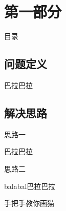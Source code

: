 \section{第一部分}
\begin{frame}[noframenumbering]{目录}
\end{frame}

\subsection{问题定义}
\begin{frame}{\insertsection}
\begin{defi}
	巴拉巴拉
\end{defi}
\end{frame}
\subsection{解决思路}
\begin{frame}{\insertsection}
	\begin{solu}
		思路一
	\end{solu}
	\vspace{1.4cm}
	巴拉巴拉
\end{frame}

\begin{frame}{\insertsection}	
	\setcounter{solu}{1}
	\begin{solu}
		思路二
	\end{solu}
	\vspace{1.4cm}
	balabal巴拉巴拉
\end{frame}

\begin{frame}{手把手教你画猫}
\end{frame}